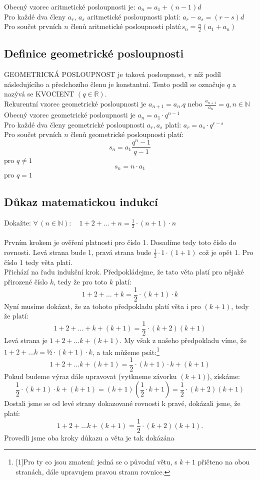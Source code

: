 Obecný vzorec aritmetické posloupnosti je: $a_n=a_1+(n-1)d$\\
Pro každé dva členy $a_r$, $a_s$ aritmetické posloupnosti platí: $a_r-a_s=(r-s)d$\\
Pro součet prvních $n$ členů aritmetické posloupnosti platí:$s_n=\frac{n}{2}(a_1+a_n)$

\subsection{Definice geometrické posloupnosti}
GEOMETRICKÁ POSLOUPNOST je taková posloupnost, v níž podíl následujícího a předchozího
členu je konstantní. Tento podíl se označuje $q$ a nazývá se KVOCIENT $(q \in \mathbb{R})$.\\
Rekurentní vzorec geometrické posloupnosti je $a_{n+1} = a_n.q$ nebo $\frac{a_{n+1}}{a_n}=q, n\in \mathbb{N}$ \\
Obecný vzorec geometrické posloupnosti je $a_n=a_1 \cdot q^{n-1}$\\
Pro každé dva členy geometrické posloupnosti $a_r, a_s$ platí: $a_r=a_s \cdot q^{r-s}$\\
Pro součet prvních $n$ členů geometrické posloupnosti platí:
$$
    s_n=a_1\frac{q^n-1}{q-1}
$$
pro $q \neq 1$\\
$$
    s_n=n \cdot a_1 
$$ 
pro $ q=1$

\subsection{Důkaz matematickou indukcí}
Dokažte: $\forall\, (n \in \mathbb{N}) :\quad 1 + 2 + \dots + n = \frac{1}{2} \cdot (n + 1) \cdot n$\\ \\

Prvním krokem je ověření platnosti pro číslo 1. Dosadíme tedy toto číslo do rovnosti. Levá strana bude
1, pravá strana bude $\frac{1}{2} \cdot 1 \cdot (1 + 1)$ což je opět 1. Pro číslo 1 tedy věta platí. \\
Přichází na řadu indukční krok. Předpokládejme, že tato věta platí pro nějaké přirozené číslo $k$, tedy že
pro toto $k$ platí:
$$
    1 + 2 + \dots + k = \frac{1}{2} \cdot (k + 1) \cdot k
$$
Nyní musíme dokázat, že za tohoto předpokladu platí věta i pro $(k + 1)$, tedy že platí:
$$
    1 + 2 + \dots + k + (k + 1) = \frac{1}{2} \cdot (k + 2)(k + 1)
$$
Levá strana je $1 + 2 + … k + (k + 1)$. My však z našeho předpokladu víme, že
$1 + 2 + … k = ½ \cdot (k + 1) \cdot k$, a tak můžeme psát:\footnote{\scalebox{.8}[1]{Pro ty co jsou zmatení: jedná se o původní větu, s $k+1$ přičteno na obou stranách, dále upravujem pravou stranu rovnice.}}
$$
    1 + 2 + … k + (k + 1) = \frac{1}{2} \cdot (k + 1) \cdot k + (k + 1)
$$
Pokud budeme výraz dále upravovat (vytkneme závorku $(k + 1)$), získáme:
$$
    \frac{1}{2} \cdot (k + 1) \cdot k + (k + 1) = (k + 1)(\frac{1}{2} \cdot k + 1) = \frac{1}{2} \cdot (k + 2)(k + 1)
$$
Dostali jsme se od levé strany dokazované rovnosti k pravé, dokázali jsme, že platí:
$$
    1 + 2 + … k + (k + 1) = \frac{1}{2} \cdot (k + 2)(k + 1).
$$
Provedli jsme oba kroky důkazu a věta je tak dokázána

